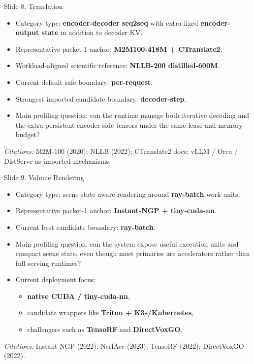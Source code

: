 \documentclass[aspectratio=169]{beamer}
\newcommand{\slidecite}[1]{\vspace{0.35em}\par{\tiny\raggedright\textit{Citations: }#1\par}}
\begin{document}
\begin{frame}[t]{Slide 8. Translation}
\small
\begin{itemize}
  \item Category type: \textbf{encoder-decoder seq2seq} with extra fixed \textbf{encoder-output state} in addition to decoder KV.
  \item Representative packet-1 anchor: \textbf{M2M100-418M + CTranslate2}.
  \item Workload-aligned scientific reference: \textbf{NLLB-200 distilled-600M}.
  \item Current default safe boundary: \textbf{per-request}.
  \item Strongest imported candidate boundary: \textbf{decoder-step}.
  \item Main profiling question: can the runtime manage both iterative decoding and the extra persistent encoder-side tensors under the same lease and memory budget?
\end{itemize}
\slidecite{M2M-100 (2020); NLLB (2022); CTranslate2 docs; vLLM / Orca / DistServe as imported mechanisms.}
\end{frame}

\begin{frame}[t]{Slide 9. Volume Rendering}
\small
\begin{itemize}
  \item Category type: scene-state-aware rendering around \textbf{ray-batch} work units.
  \item Representative packet-1 anchor: \textbf{Instant-NGP + tiny-cuda-nn}.
  \item Current best candidate boundary: \textbf{ray-batch}.
  \item Main profiling question: can the system expose useful execution units and compact scene state, even though most primaries are accelerators rather than full serving runtimes?
  \item Current deployment focus:
  \begin{itemize}
    \item \textbf{native CUDA / tiny-cuda-nn},
    \item candidate wrappers like \textbf{Triton + K3s/Kubernetes},
    \item challengers such as \textbf{TensoRF} and \textbf{DirectVoxGO}.
  \end{itemize}
\end{itemize}
\slidecite{Instant-NGP (2022); NerfAcc (2023); TensoRF (2022); DirectVoxGO (2022).}
\end{frame}
\end{document}
